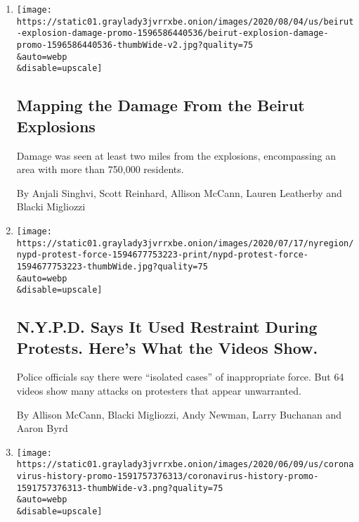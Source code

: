 \begin{enumerate}
\def\labelenumi{\arabic{enumi}.}
\item
  \href{/interactive/2020/08/04/world/middleeast/beirut-explosion-damage.html}{}

  \texttt{[image: https://static01.graylady3jvrrxbe.onion/images/2020/08/04/us/beirut-explosion-damage-promo-1596586440536/beirut-explosion-damage-promo-1596586440536-thumbWide-v2.jpg?quality=75\\\&auto=webp\\\&disable=upscale]}

  \hypertarget{mapping-the-damage-from-the-beirut-explosions}{%
  \subsection{Mapping the Damage From the Beirut
  Explosions}\label{mapping-the-damage-from-the-beirut-explosions}}

  Damage was seen at least two miles from the explosions, encompassing
  an area with more than 750,000 residents.

  By Anjali Singhvi, Scott Reinhard, Allison McCann, Lauren Leatherby
  and Blacki Migliozzi
\item
  \href{/interactive/2020/07/14/nyregion/nypd-george-floyd-protests.html}{}

  \texttt{[image: https://static01.graylady3jvrrxbe.onion/images/2020/07/17/nyregion/nypd-protest-force-1594677753223-print/nypd-protest-force-1594677753223-thumbWide.jpg?quality=75\\\&auto=webp\\\&disable=upscale]}

  \hypertarget{nypd-says-it-used-restraint-during-protests-heres-what-the-videos-show}{%
  \subsection{N.Y.P.D. Says It Used Restraint During Protests. Here's
  What the Videos
  Show.}\label{nypd-says-it-used-restraint-during-protests-heres-what-the-videos-show}}

  Police officials say there were ``isolated cases'' of inappropriate
  force. But 64 videos show many attacks on protesters that appear
  unwarranted.

  By Allison McCann, Blacki Migliozzi, Andy Newman, Larry Buchanan and
  Aaron Byrd
\item
  \href{/interactive/2020/06/10/world/coronavirus-history.html}{}

  \texttt{[image: https://static01.graylady3jvrrxbe.onion/images/2020/06/09/us/coronavirus-history-promo-1591757376313/coronavirus-history-promo-1591757376313-thumbWide-v3.png?quality=75\\\&auto=webp\\\&disable=upscale]}


\end{enumerate}
